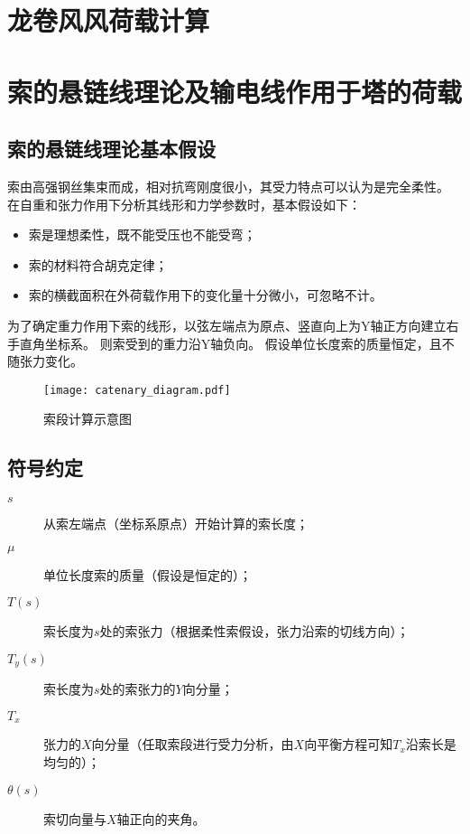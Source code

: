 \section{龙卷风风荷载计算}


\section{索的悬链线理论及输电线作用于塔的荷载}

\subsection{索的悬链线理论基本假设}
索由高强钢丝集束而成，相对抗弯刚度很小，其受力特点可以认为是完全柔性。
在自重和张力作用下分析其线形和力学参数时，基本假设如下：

\begin{itemize}
  \item
  索是理想柔性，既不能受压也不能受弯；
  \item
  索的材料符合胡克定律；
  \item
  索的横截面积在外荷载作用下的变化量十分微小，可忽略不计。
\end{itemize}

为了确定重力作用下索的线形，以弦左端点为原点、竖直向上为Y轴正方向建立右手直角坐标系。
则索受到的重力沿Y轴负向。
假设单位长度索的质量恒定，且不随张力变化。

\begin{figure}[!htbp]
  \centering
  \texttt{[image: catenary\_diagram.pdf]}
  \label{fig:catenary}
  \caption{索段计算示意图}
\end{figure}

\subsection{符号约定}
\begin{description}
  \item[$s$]
  从索左端点（坐标系原点）开始计算的索长度；
  \item[$\mu$]
  单位长度索的质量（假设是恒定的）；
  \item[$T(s)$]
  索长度为$s$处的索张力（根据柔性索假设，张力沿索的切线方向）；
  \item[$T_y(s)$]
  索长度为$s$处的索张力的$Y$向分量；
  \item[$T_x$]
  张力的$X$向分量（任取索段进行受力分析，由$X$向平衡方程可知$T_x$沿索长是均匀的）；
  \item[$\theta(s)$]
  索切向量与$X$轴正向的夹角。
\end{description}

